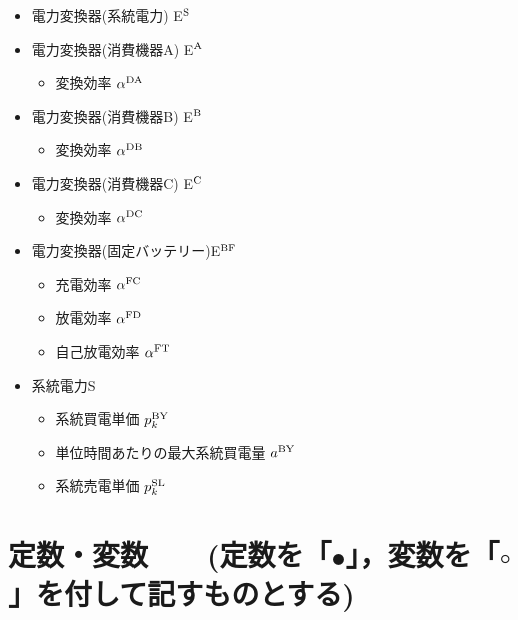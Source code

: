 \documentclass{jarticle}
\newcommand{\IB}{$\bullet$}
\newcommand{\IC}{$\circ$}
\newcommand{\IS}{$*$}
\begin{document}
\begin{itemize}
\begin{itemize}
  \end{itemize}
 \item[\IS] 電力変換器(系統電力) E$^{\rm S}$
 \item[\IS] 電力変換器(消費機器A) E$^{\rm A}$
  \begin{itemize}
   \item[\IB] 変換効率 $\alpha^{\rm DA}$
  \end{itemize}
 \item[\IS] 電力変換器(消費機器B) E$^{\rm B}$
  \begin{itemize}
   \item[\IB] 変換効率 $\alpha^{\rm DB}$
  \end{itemize}
 \item[\IS] 電力変換器(消費機器C) E$^{\rm C}$
  \begin{itemize}
   \item[\IB] 変換効率 $\alpha^{\rm DC}$
  \end{itemize}
 \item[\IS] 電力変換器(固定バッテリー)E$^{\rm BF}$
  \begin{itemize}
   \item[\IB] 充電効率 $\alpha^{\rm FC}$
   \item[\IB] 放電効率 $\alpha^{\rm FD}$
   \item[\IB] 自己放電効率 $\alpha^{\rm FT}$
  \end{itemize}
 \item[\IS] 系統電力S
   \begin{itemize}
   \item[\IB] 系統買電単価 $p^{\rm BY}_{k}$
   \item[\IB] 単位時間あたりの最大系統買電量 $a^{\rm BY}$
   \item[\IB] 系統売電単価 $p^{\rm SL}_{k}$
  \end{itemize}
\end{itemize}

\section{定数・変数 \mbox{\normalsize\rm 
~ (定数を「\IB」，変数を「\IC」を付して記すものとする)}}
\end{document}
